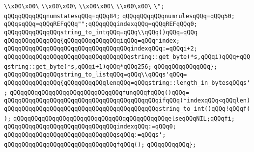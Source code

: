 \verb|\\x00\x00\|\newline
\verb|\\x00\x00\|\newline
\verb|\\x00\x00\|\newline
\verb|\\x00\x00\|\newline
\verb|\";|\newline
\verb|qQQqqQQqqQQqnumstatesqQQq=qQQq84;|\newline
\verb|qQQqqQQqqQQqnumrulesqQQq=qQQq50;|\newline
\verb|qQQqsqQQq=qQQqREFqQQq"";qQQqqQQqindexqQQq=qQQqREFqQQq0;|\newline
\verb|qQQqqQQqqQQqqQQqstring_to_intqQQq=qQQq\\qQQq()qQQq=qQQq|\newline
\verb|qQQqqQQqqQQqqQQq{qQQqqQQqqQQqqQQqiqQQq=qQQq*index;|\newline
\verb|qQQqqQQqqQQqqQQqqQQqqQQqqQQqqQQqqQQqindexqQQq:=qQQqi+2;|\newline
\verb|qQQqqQQqqQQqqQQqqQQqqQQqqQQqqQQqqQQqstring::get_byte(*s,qQQqi)qQQq+qQQqstring::get_byte(*s,qQQqi+1)qQQq*qQQq256;|\newline
\verb|qQQqqQQqqQQqqQQq};|\newline
\newline
\verb|qQQqqQQqqQQqqQQqstring_to_listqQQq=qQQq\\qQQqs'qQQq=|\newline
\verb|qQQqqQQqqQQqqQQq{qQQqqQQqqQQqlenqQQq=qQQqstring::length_in_bytesqQQqs';|\newline
\verb|qQQqqQQqqQQqqQQqqQQqqQQqqQQqqQQqfunqQQqfqQQq()qQQq=|\newline
\verb|qQQqqQQqqQQqqQQqqQQqqQQqqQQqqQQqqQQqqQQqqQQqifqQQq(*indexqQQq<qQQqlen)|\newline
\verb|qQQqqQQqqQQqqQQqqQQqqQQqqQQqqQQqqQQqqQQqqQQqstring_to_int()qQQq!qQQqf();|\newline
\verb|qQQqqQQqqQQqqQQqqQQqqQQqqQQqqQQqqQQqqQQqqQQqelseqQQqNIL;qQQqfi;|\newline
\verb|qQQqqQQqqQQqqQQqqQQqqQQqqQQqqQQqindexqQQq:=qQQq0;|\newline
\verb|qQQqqQQqqQQqqQQqqQQqqQQqqQQqqQQqsqQQq:=qQQqs';|\newline
\verb|qQQqqQQqqQQqqQQqqQQqqQQqqQQqqQQqfqQQq();|\newline
\verb|qQQqqQQqqQQq};|\newline
\newline
